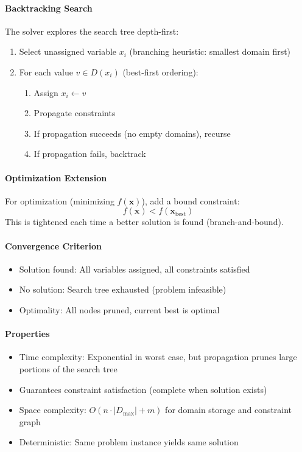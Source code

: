\documentclass{report}
\begin{document}
\paragraph{Backtracking Search}
The solver explores the search tree depth-first:
\begin{enumerate}
\item Select unassigned variable $x_i$ (branching heuristic: smallest domain first)
\item For each value $v \in D(x_i)$ (best-first ordering):
\begin{enumerate}
\item Assign $x_i \leftarrow v$
\item Propagate constraints
\item If propagation succeeds (no empty domains), recurse
\item If propagation fails, backtrack
\end{enumerate}
\end{enumerate}

\paragraph{Optimization Extension}
For optimization (minimizing $f(\mathbf{x})$), add a bound constraint:
\begin{equation}
f(\mathbf{x}) < f(\mathbf{x}_{\text{best}})
\end{equation}
This is tightened each time a better solution is found (branch-and-bound).

\paragraph{Convergence Criterion}
\begin{itemize}
\item Solution found: All variables assigned, all constraints satisfied
\item No solution: Search tree exhausted (problem infeasible)
\item Optimality: All nodes pruned, current best is optimal
\end{itemize}

\paragraph{Properties}
\begin{itemize}
\item Time complexity: Exponential in worst case, but propagation prunes large portions of the search tree
\item Guarantees constraint satisfaction (complete when solution exists)
\item Space complexity: $O(n \cdot |D_{\max}| + m)$ for domain storage and constraint graph
\item Deterministic: Same problem instance yields same solution
\end{itemize}
\end{document}
